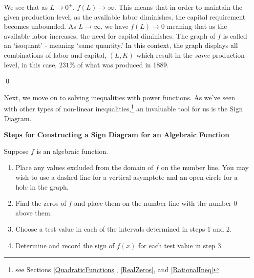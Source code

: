 \documentclass{ximera}
\begin{document}
\begin{example}
\begin{enumerate}
We see that as $L \rightarrow 0^{+}$, $f(L) \rightarrow \infty$.  This means that in order to maintain the given production level, as the available labor diminishes, the capital requirement becomes unbounded.  As $L \rightarrow \infty$, we have $f(L) \rightarrow 0$ meaning that as the available labor increases, the need for capital diminishes.  The graph of $f$ is called an `isoquant' - meaning `same quantity.'  In this context, the graph displays all combinations of labor and capital, $(L,K)$  which result in the \textit{same} production level, in this case, $231 \%$ of what was produced in 1889.




\end{enumerate}

\qed

\end{example}

Next, we move on to solving inequalities with power functions.  As we've seen with other types of non-linear inequalities,\footnote{see Sections \ref{QuadraticFunctions}, \ref{RealZeros}, and \ref{RationalIneq}} an invaluable tool for us is the Sign Diagram.

\label{algebraicsigndiagram}


\centerline{\textbf{Steps for Constructing a Sign Diagram for an Algebraic Function}} 

\medskip

\hspace{.17in} Suppose $f$ is an algebraic function. 

\begin{enumerate}

\item  Place any values excluded from the domain of  $f$ on the number line.  You may wish to use a dashed line for a vertical asymptote and an open circle for a hole in the graph.

\item  Find the zeros of $f$ and place them on the number line with the number $0$ above them.

\item  Choose a test value in each of the intervals determined in steps 1 and 2.

\item  Determine and record the sign of $f(x)$ for each test value in step 3.

\end{enumerate}
\end{document}
